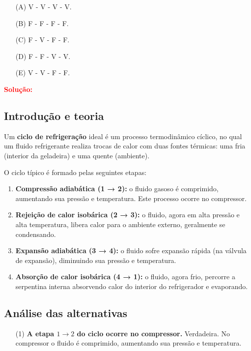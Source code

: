 \documentclass[a4paper,12pt]{article}
\begin{document}
\begin{flushleft}
\begin{itemize}
\item[(A)] V - V - V - V.
\item[(B)] F - F - F - F.
\item[(C)] F - V - F - F.
\item[(D)] F - F - V - V.
\item[(E)] V - V - F - F.
\end{itemize}

\vspace{0.5cm}

\textcolor{red}{\textbf{Solução:}}\\

\subsection*{Introdução e teoria}

Um \textbf{ciclo de refrigeração} ideal é um processo termodinâmico cíclico, no qual um fluido refrigerante realiza trocas de calor com duas fontes térmicas: uma fria (interior da geladeira) e uma quente (ambiente).  

O ciclo típico é formado pelas seguintes etapas:
\begin{enumerate}
    \item \textbf{Compressão adiabática (1 → 2):} o fluido gasoso é comprimido, aumentando sua pressão e temperatura. Este processo ocorre no compressor.
    \item \textbf{Rejeição de calor isobárica (2 → 3):} o fluido, agora em alta pressão e alta temperatura, libera calor para o ambiente externo, geralmente se condensando.
    \item \textbf{Expansão adiabática (3 → 4):} o fluido sofre expansão rápida (na válvula de expansão), diminuindo sua pressão e temperatura.
    \item \textbf{Absorção de calor isobárica (4 → 1):} o fluido, agora frio, percorre a serpentina interna absorvendo calor do interior do refrigerador e evaporando.
\end{enumerate}

\subsection*{Análise das alternativas}

\begin{itemize}
    \item[(1)] \textbf{A etapa \(1 \to 2\) do ciclo ocorre no compressor.}  
    Verdadeira. No compressor o fluido é comprimido, aumentando sua pressão e temperatura.  


\end{itemize}
\end{flushleft}
\end{document}
